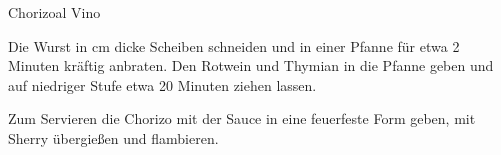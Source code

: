 \begin{recipe}{Chorizo}{al Vino}\label{Chorizo}
  \inglist

  \steps

  Die Wurst in \halb cm dicke Scheiben schneiden und in einer Pfanne für etwa
  2 Minuten kräftig anbraten. Den Rotwein und Thymian in die Pfanne geben und auf
  niedriger Stufe etwa 20 Minuten ziehen lassen. 
  
  Zum Servieren die Chorizo mit der Sauce in eine feuerfeste Form geben, mit
  Sherry übergießen und flambieren.
  
\end{recipe}
